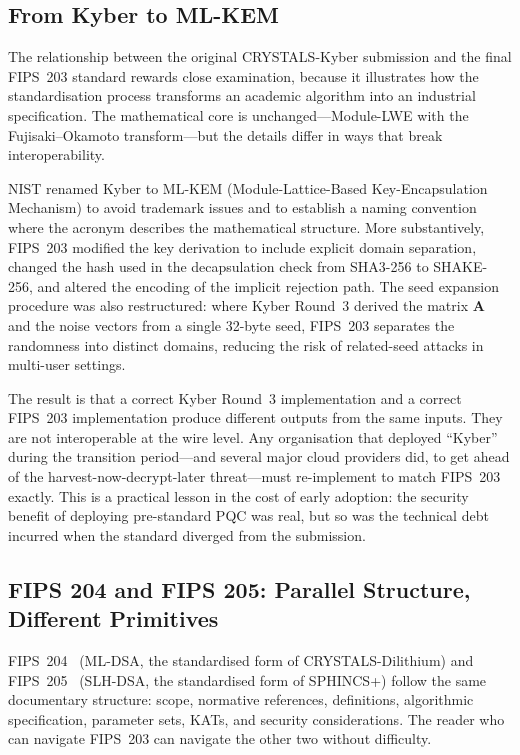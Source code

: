 \subsection{From Kyber to ML-KEM}
\label{subsec:kyber-to-mlkem}

The relationship between the original CRYSTALS-Kyber submission and the final FIPS~203 standard rewards close examination, because it illustrates how the standardisation process transforms an academic algorithm into an industrial specification. The mathematical core is unchanged---Module-LWE with the Fujisaki--Okamoto transform---but the details differ in ways that break interoperability.

NIST renamed Kyber to ML-KEM (Module-Lattice-Based Key-Encapsulation Mechanism) to avoid trademark issues and to establish a naming convention where the acronym describes the mathematical structure. More substantively, FIPS~203 modified the key derivation to include explicit domain separation, changed the hash used in the decapsulation check from SHA3-256 to SHAKE-256, and altered the encoding of the implicit rejection path. The seed expansion procedure was also restructured: where Kyber Round~3 derived the matrix $\mathbf{A}$ and the noise vectors from a single 32-byte seed, FIPS~203 separates the randomness into distinct domains, reducing the risk of related-seed attacks in multi-user settings.

The result is that a correct Kyber Round~3 implementation and a correct FIPS~203 implementation produce different outputs from the same inputs. They are not interoperable at the wire level. Any organisation that deployed ``Kyber'' during the transition period---and several major cloud providers did, to get ahead of the harvest-now-decrypt-later threat---must re-implement to match FIPS~203 exactly. This is a practical lesson in the cost of early adoption: the security benefit of deploying pre-standard PQC was real, but so was the technical debt incurred when the standard diverged from the submission.

\subsection{FIPS 204 and FIPS 205: Parallel Structure, Different Primitives}
\label{subsec:fips204-fips205}

FIPS~204~\cite{FIPS204} (ML-DSA, the standardised form of CRYSTALS-Dilithium) and FIPS~205~\cite{FIPS205} (SLH-DSA, the standardised form of SPHINCS+) follow the same documentary structure: scope, normative references, definitions, algorithmic specification, parameter sets, KATs, and security considerations. The reader who can navigate FIPS~203 can navigate the other two without difficulty.

